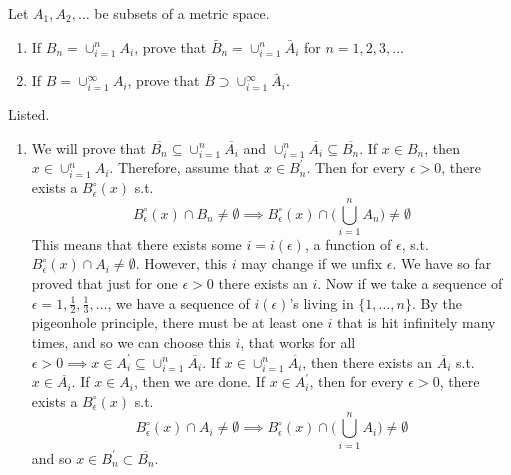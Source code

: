   \begin{exercise}[Rudin 2.7]
    Let $A_1, A_2, \ldots$ be subsets of a metric space. 
    \begin{enumerate}
      \item If $B_n = \cup_{i=1}^n A_i$, prove that $\bar{B}_n = \cup_{i=1}^n \bar{A}_i$ for $n = 1, 2, 3, \ldots$ 
      \item If $B = \cup_{i=1}^\infty A_i$, prove that $\bar{B} \supset \cup_{i=1}^\infty \bar{A}_i$. 
    \end{enumerate}
  \end{exercise}
  \begin{solution}
    Listed. 
    \begin{enumerate}
        \item We will prove that $\overline{B_n} \subseteq \cup_{i=1}^n \overline{A_i}$ and $\cup_{i=1}^n \overline{A_i} \subseteq \overline{B_n}$. If $x \in B_n$, then $x \in \cup_{i=1}^n A_i$. Therefore, assume that $x \in B_n^\prime$. Then for every $\epsilon > 0$, there exists a $B_\epsilon^\circ (x)$ s.t. 
          \begin{equation}
            B_\epsilon^\circ (x) \cap B_n \neq \emptyset \implies B_\epsilon^\circ (x) \cap \bigg( \bigcup_{i=1}^n A_n \bigg) \neq \emptyset
          \end{equation}
          This means that there exists some $i = i(\epsilon)$, a function of $\epsilon$, s.t. $B_\epsilon^\circ (x) \cap A_i \neq \emptyset$. However, this $i$ may change if we unfix $\epsilon$. We have so far proved that just for one $\epsilon > 0$ there exists an $i$. Now if we take a sequence of $\epsilon = 1, \frac{1}{2}, \frac{1}{3}, \ldots$, we have a sequence of $i(\epsilon)$'s living in $\{1, \ldots, n\}$. By the pigeonhole principle, there must be at least one $i$ that is hit infinitely many times, and so we can choose this $i$, that works for all $\epsilon > 0 \implies x \in A_i^\prime \subseteq \cup_{i=1}^n \overline{A_i}$. If $x \in \cup_{i=1}^n \overline{A_i}$, then there exists an $\overline{A_i}$ s.t. $x \in \overline{A_i}$. If $x \in A_i$, then we are done. If $x \in A_i^\prime$, then for every $\epsilon > 0$, there exists a $B_\epsilon^\circ (x)$ s.t. 
          \begin{equation}
            B_\epsilon^\circ (x) \cap A_i \neq \emptyset \implies B_\epsilon^\circ (x) \cap \bigg( \bigcup_{i=1}^n A_i \bigg) \neq \emptyset
          \end{equation}
          and so $x \in B_n^\prime \subset \overline{B_n}$. 


\end{enumerate}
\end{solution}
